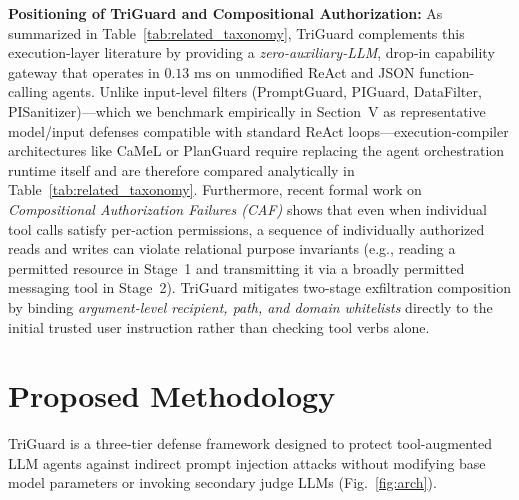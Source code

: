 \documentclass[conference]{IEEEtran}
\begin{document}
\textbf{Positioning of TriGuard and Compositional Authorization:} As summarized in Table~\ref{tab:related_taxonomy}, TriGuard complements this execution-layer literature by providing a \emph{zero-auxiliary-LLM}, drop-in capability gateway that operates in $0.13\text{ ms}$ on unmodified ReAct and JSON function-calling agents. Unlike input-level filters (PromptGuard, PIGuard, DataFilter, PISanitizer)---which we benchmark empirically in Section~V as representative model/input defenses compatible with standard ReAct loops---execution-compiler architectures like CaMeL \cite{b16} or PlanGuard \cite{b17} require replacing the agent orchestration runtime itself and are therefore compared analytically in Table~\ref{tab:related_taxonomy}. Furthermore, recent formal work on \emph{Compositional Authorization Failures (CAF)} \cite{b26} shows that even when individual tool calls satisfy per-action permissions, a sequence of individually authorized reads and writes can violate relational purpose invariants (e.g., reading a permitted resource in Stage~1 and transmitting it via a broadly permitted messaging tool in Stage~2). TriGuard mitigates two-stage exfiltration composition by binding \emph{argument-level recipient, path, and domain whitelists} directly to the initial trusted user instruction rather than checking tool verbs alone.

\section{Proposed Methodology}
TriGuard is a three-tier defense framework designed to protect tool-augmented LLM agents against indirect prompt injection attacks without modifying base model parameters or invoking secondary judge LLMs (Fig.~\ref{fig:arch}).
\end{document}
